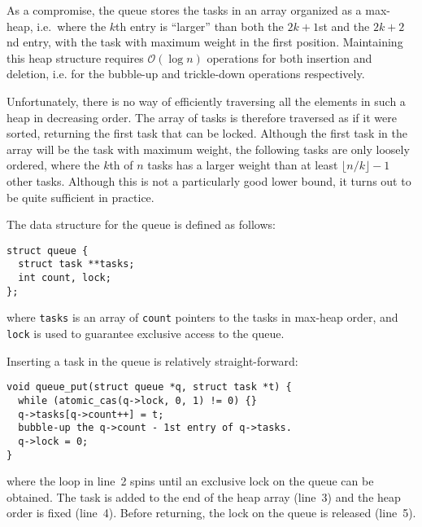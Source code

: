 \documentclass[fleqn,10pt]{wlpeerj}
\newcommand{\oh}[1]
    {\mbox{$ {\mathcal O}( #1 ) $}}
\begin{document}
As a compromise, the queue stores the tasks in an array
organized as a max-heap, i.e.~where the $k$th entry is ``larger''
than both the $2k+1$st and the $2k+2$nd entry,
with the task with maximum weight
in the first position.
Maintaining this heap structure requires \oh{\log n}
operations for both insertion and deletion, i.e. for the
bubble-up and trickle-down operations respectively.

Unfortunately, there is no way of efficiently traversing all
the elements in such a heap in decreasing order.
The array of tasks is therefore traversed as if it were sorted,
returning the first task that can be locked.
Although the first task in the array will be the task with
maximum weight, the following tasks are only loosely ordered,
where the $k$th of $n$ tasks has a larger weight than at least
$\lfloor n/k\rfloor -1$ other tasks.
Although this is not a particularly good lower bound, it turns
out to be quite sufficient in practice.

The data structure for the queue is defined as follows:
\begin{center}\begin{minipage}{0.9\textwidth}
    \begin{lstlisting}
struct queue {
  struct task **tasks;
  int count, lock;
};
    \end{lstlisting}
\end{minipage}\end{center}
\noindent where {\tt tasks} is an array of {\tt count} pointers
to the tasks in max-heap order, and {\tt lock} is used to
guarantee exclusive access to the queue.

Inserting a task in the queue is relatively straight-forward:
\begin{center}\begin{minipage}{0.9\textwidth}
    \begin{lstlisting}
void queue_put(struct queue *q, struct task *t) {
  while (atomic_cas(q->lock, 0, 1) != 0) {}
  q->tasks[q->count++] = t;
  bubble-up the q->count - 1st entry of q->tasks.
  q->lock = 0;
}
    \end{lstlisting}
\end{minipage}\end{center}
\noindent where the loop in line~2 spins until an exclusive
lock on the queue can be obtained.
The task is added to the end of the heap array (line~3)
and the heap order is fixed (line~4).
Before returning, the lock on the queue is released (line~5).
\end{document}
